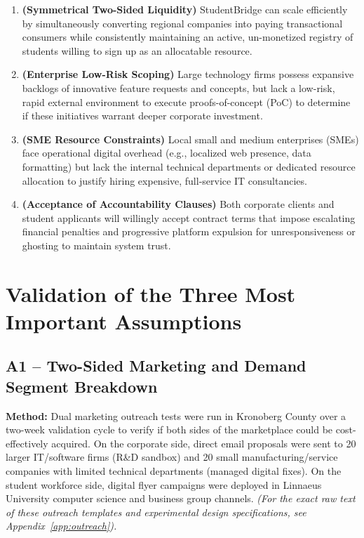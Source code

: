 \documentclass[12pt,a4paper]{article}
\begin{document}
\begin{enumerate}[label=\textbf{A\arabic*}.]
    \item \textbf{(Symmetrical Two-Sided Liquidity)} StudentBridge can scale efficiently by simultaneously converting regional companies into paying transactional consumers while consistently maintaining an active, un-monetized registry of students willing to sign up as an allocatable resource.
    \item \textbf{(Enterprise Low-Risk Scoping)} Large technology firms possess expansive backlogs of innovative feature requests and concepts, but lack a low-risk, rapid external environment to execute proofs-of-concept (PoC) to determine if these initiatives warrant deeper corporate investment.
    \item \textbf{(SME Resource Constraints)} Local small and medium enterprises (SMEs) face operational digital overhead (e.g., localized web presence, data formatting) but lack the internal technical departments or dedicated resource allocation to justify hiring expensive, full-service IT consultancies.
    \item \textbf{(Acceptance of Accountability Clauses)} Both corporate clients and student applicants will willingly accept contract terms that impose escalating financial penalties and progressive platform expulsion for unresponsiveness or ghosting to maintain system trust.
\end{enumerate}

\section{Validation of the Three Most Important Assumptions}

\subsection{A1 -- Two-Sided Marketing and Demand Segment Breakdown}

\textbf{Method:} Dual marketing outreach tests were run in Kronoberg County over a two-week validation cycle to verify if both sides of the marketplace could be cost-effectively acquired. On the corporate side, direct email proposals were sent to 20 larger IT/software firms (R\&D sandbox) and 20 small manufacturing/service companies with limited technical departments (managed digital fixes). On the student workforce side, digital flyer campaigns were deployed in Linnaeus University computer science and business group channels. \textit{(For the exact raw text of these outreach templates and experimental design specifications, see Appendix~\ref{app:outreach}).}
\end{document}
